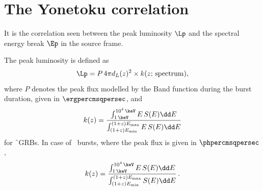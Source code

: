 \section{The Yonetoku correlation}
\label{sec:Yonetoku_correlation--long}
It is the correlation seen between the peak luminosity $\Lp$ and the spectral energy break $\Ep$  in the source frame.

The peak luminosity is defined as
\begin{equation}
\Lp = P \, 4\pi d_L(z)^{2} \times k(z; \,{\rm spectrum}),
\label{eq:Luminosity_formula}
\end{equation} where $P$ denotes the peak flux modelled by the Band function during the burst duration, given in $\ergpercmsqpersec$, and
\begin{equation}
k(z) = \dfrac{\int_{1 \, \keV}^{10^4 \, \keV} E \, S(E) \dd E}{\int_{(1+z)E_{\rm{min}}}^{(1+z)E_{\rm{max}}} E \, S(E) \dd E}
\label{eq:definition_of_k---Fermi--long}
\end{equation} for \f\ GRBs. In case of \s\ bursts, where the peak flux is given in $\phpercmsqpersec$,
\begin{equation}
k(z) = \dfrac{\int_{1 \, \keV}^{10^4 \, \keV} E \, S(E) \dd E}{\int_{(1+z)E_{\rm{min}}}^{(1+z)E_{\rm{max}}} S(E) \dd E} \,.
\label{eq:definition_of_k---Swift--long}
\end{equation}


